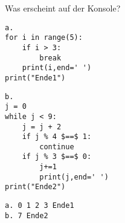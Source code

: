 \question[4] Was erscheint auf der Konsole? \\
\begin{minipage}[c]{6cm}
\begin{lstlisting}
a.
for i in range(5):
    if i > 3:
        break
    print(i,end=' ')
print("Ende1")
\end{lstlisting}
\end{minipage}
\begin{minipage}[c]{6cm}
\begin{lstlisting}
b.
j = 0
while j < 9:
    j = j + 2
    if j % 4 $==$ 1:
        continue
    if j % 3 $==$ 0:
        j+=1
        print(j,end=' ')
print("Ende2")
\end{lstlisting}
\end{minipage}
\begin{solutionbox}{2cm}
\begin{lstlisting}
a. 0 1 2 3 Ende1
b. 7 Ende2
\end{lstlisting}
\end{solutionbox}
